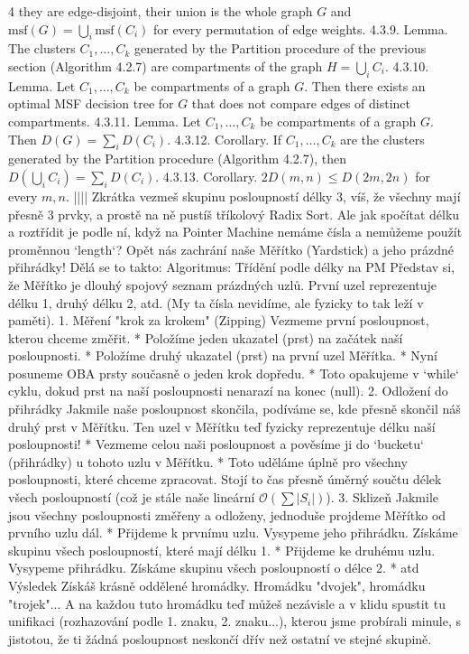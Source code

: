 \documentclass[8pt]{extarticle}
\begin{document}
\begin{multicols*}{4}
they are edge-disjoint, their union is the whole graph $G$ and $\mathrm{msf}(G) = \bigcup_i \mathrm{msf}(C_i)$ for every permutation of edge weights. {4.3.9. Lemma.} The clusters $C_1, \dots, C_k$ generated by the Partition procedure of the previous section (Algorithm 4.2.7) are compartments of the graph $H = \bigcup_i C_i$. {4.3.10. Lemma.} Let $C_1, \dots, C_k$ be compartments of a graph $G$. Then there exists an optimal MSF decision tree for $G$ that does not compare edges of distinct compartments. {4.3.11. Lemma.} Let $C_1, \dots, C_k$ be compartments of a graph $G$. Then $D(G) = \sum_i D(C_i)$. {4.3.12. Corollary.} If $C_1, \dots, C_k$ are the clusters generated by the Partition procedure (Algorithm 4.2.7), then $D(\bigcup_i C_i) = \sum_i D(C_i)$. {4.3.13. Corollary.} $2D(m,n) \le D(2m,2n)$ for every $m,n$.
||||
Zkrátka vezmeš skupinu posloupností délky 3, víš, že všechny mají přesně 3 prvky, a prostě na ně pustíš tříkolový Radix Sort.
Ale jak spočítat délku a roztřídit je podle ní, když na Pointer Machine nemáme čísla a nemůžeme použít proměnnou `length`?
Opět nás zachrání naše Měřítko (Yardstick) a jeho prázdné přihrádky! Dělá se to takto:
Algoritmus: Třídění podle délky na PM
Představ si, že Měřítko je dlouhý spojový seznam prázdných uzlů. První uzel reprezentuje délku 1, druhý délku 2, atd. (My ta čísla nevidíme, ale fyzicky to tak leží v paměti).
1. Měření "krok za krokem" (Zipping)
Vezmeme první posloupnost, kterou chceme změřit.
* Položíme jeden ukazatel (prst) na začátek naší posloupnosti.
* Položíme druhý ukazatel (prst) na první uzel Měřítka.
* Nyní posuneme OBA prsty současně o jeden krok dopředu.
* Toto opakujeme v `while` cyklu, dokud prst na naší posloupnosti nenarazí na konec (null).
2. Odložení do přihrádky
Jakmile naše posloupnost skončila, podíváme se, kde přesně skončil náš druhý prst v Měřítku. Ten uzel v Měřítku teď fyzicky reprezentuje délku naší posloupnosti!
* Vezmeme celou naši posloupnost a pověsíme ji do `bucketu` (přihrádky) u tohoto uzlu v Měřítku.
* Toto uděláme úplně pro všechny posloupnosti, které chceme zpracovat. Stojí to čas přesně úměrný součtu délek všech posloupností (což je stále naše lineární $\mathcal{O}(\sum |S_i|)$).
3. Sklizeň
Jakmile jsou všechny posloupnosti změřeny a odloženy, jednoduše projdeme Měřítko od prvního uzlu dál.
* Přijdeme k prvnímu uzlu. Vysypeme jeho přihrádku. Získáme skupinu všech posloupností, které mají délku 1.
* Přijdeme ke druhému uzlu. Vysypeme přihrádku. Získáme skupinu všech posloupností o délce 2.
* atd
Výsledek
Získáš krásně oddělené hromádky. Hromádku "dvojek", hromádku "trojek"... A na každou tuto hromádku teď můžeš nezávisle a v klidu spustit tu unifikaci (rozhazování podle 1. znaku, 2. znaku...), kterou jsme probírali minule, s jistotou, že ti žádná posloupnost neskončí dřív než ostatní ve stejné skupině.

\end{multicols*}
\end{document}
